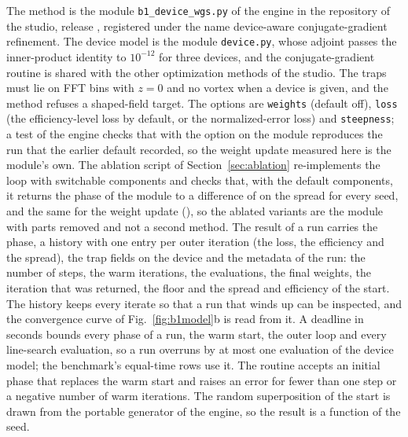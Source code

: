 The method is the module \texttt{b1\_device\_wgs.py} of the engine in the repository of the studio, release \engineRelease, registered under the name device-aware conjugate-gradient refinement. The device model is the module \texttt{device.py}, whose adjoint passes the inner-product identity to $10^{-12}$ for three devices, and the conjugate-gradient routine is shared with the other
optimization methods of the studio. The traps must lie on FFT bins with $z=0$ and no vortex when a device is given, and the method refuses a shaped-field target. The options are \texttt{weights} (default off), \texttt{loss} (the efficiency-level loss by default, or the normalized-error loss) and \texttt{steepness}; a test of the engine checks that with the option on the module reproduces the run that the earlier default recorded, so the weight update measured here is the module's own. The ablation script of Section~\ref{sec:ablation} re-implements the loop with switchable components and checks that, with the default components, it returns the
phase of the module to a difference of \ablBCheck{} on the spread for every seed, and the same for the weight update (\ablBWeightsCheck{}), so the ablated variants are the module with parts removed and not a second method. The result of a run carries the phase, a history with one entry per outer iteration (the loss, the efficiency and the spread), the trap fields on the device and the metadata of the run: the number of steps, the warm iterations, the evaluations, the final weights, the iteration that was returned, the floor and the spread and efficiency of the start. The history keeps every iterate so that a run that winds up can be inspected, and the convergence curve of Fig.~\ref{fig:b1model}b is read from it. A deadline in seconds bounds every phase of a run, the warm start, the outer loop and every line-search evaluation, so a run overruns by at most one evaluation of the device model; the benchmark's equal-time rows use it. The routine accepts an initial phase that replaces the warm start and raises an error for fewer than one step or a negative number of warm iterations. The random superposition of the start is drawn from the portable generator of the engine, so the result is a function of the seed.
